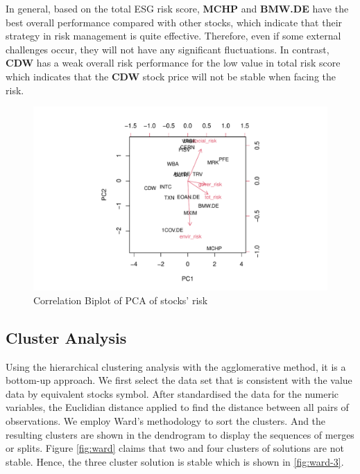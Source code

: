 \documentclass[11pt,a4paper,]{article}
\begin{document}
In general, based on the total ESG risk score, \textbf{MCHP} and \textbf{BMW.DE} have the best overall performance compared with other stocks, which indicate that their strategy in risk management is quite effective. Therefore, even if some external challenges occur, they will not have any significant fluctuations. In contrast, \textbf{CDW} has a weak overall risk performance for the low value in total risk score which indicates that the \textbf{CDW} stock price will not be stable when facing the risk.

\begin{figure}
\centering
\includegraphics{ass2_files/figure-latex/pca-risk-correlation-1.pdf}
\caption{\label{fig:pca-risk-correlation}Correlation Biplot of PCA of stocks' risk}
\end{figure}

\hypertarget{cluster-analysis}{%
\subsection{Cluster Analysis}\label{cluster-analysis}}

Using the hierarchical clustering analysis with the agglomerative method, it is a bottom-up approach. We first select the data set that is consistent with the value data by equivalent stocks symbol. After standardised the data for the numeric variables, the Euclidian distance applied to find the distance between all pairs of observations. We employ Ward's methodology to sort the clusters. And the resulting clusters are shown in the dendrogram to display the sequences of merges or splits. Figure \ref{fig:ward} claims that two and four clusters of solutions are not stable. Hence, the three cluster solution is stable which is shown in \ref{fig:ward-3}.
\end{document}
